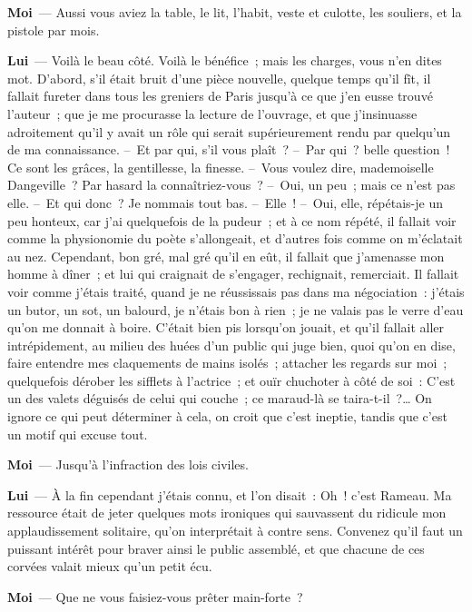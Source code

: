 \documentclass[french,twoside]{book} %
\newcommand{\labelchar}[1]{\textbf{\color{rubric} #1}}
\begin{document}
\labelchar{Moi} — Aussi vous aviez la table, le lit, l’habit, veste et culotte, les souliers, et la pistole par mois.\par
\labelchar{Lui} — Voilà le beau côté. Voilà le bénéfice ; mais les charges, vous n’en dites mot. D’abord, s’il était bruit d’une pièce nouvelle, quelque temps qu’il fît, il fallait fureter dans tous les greniers de Paris jusqu’à ce que j’en eusse trouvé l’auteur ; que je me procurasse la lecture de l’ouvrage, et que j’insinuasse adroitement qu’il y avait un rôle qui serait supérieurement rendu par quelqu’un de ma connaissance. – Et par qui, s’il vous plaît ? – Par qui ? belle question ! Ce sont les grâces, la gentillesse, la finesse. – Vous voulez dire, mademoiselle Dangeville ? Par hasard la connaîtriez-vous ? – Oui, un peu ; mais ce n’est pas elle. – Et qui donc ? Je nommais tout bas. – Elle ! – Oui, elle, répétais-je un peu honteux, car j’ai quelquefois de la pudeur ; et à ce nom répété, il fallait voir comme la physionomie du poète s’allongeait, et d’autres fois comme on m’éclatait au nez. Cependant, bon gré, mal gré qu’il en eût, il fallait que j’amenasse mon homme à dîner ; et lui qui craignait de s’engager, rechignait, remerciait. Il fallait voir comme j’étais traité, quand je ne réussissais pas dans ma négociation : j’étais un butor, un sot, un balourd, je n’étais bon à rien ; je ne valais pas le verre d’eau qu’on me donnait à boire. C’était bien pis lorsqu’on jouait, et qu’il fallait aller intrépidement, au milieu des huées d’un public qui juge bien, quoi qu’on en dise, faire entendre mes claquements de mains isolés ; attacher les regards sur moi ; quelquefois dérober les sifflets à l’actrice ; et ouïr chuchoter à côté de soi : C’est un des valets déguisés de celui qui couche ; ce maraud-là se taira-t-il ?… On ignore ce qui peut déterminer à cela, on croit que c’est ineptie, tandis que c’est un motif qui excuse tout.\par
\labelchar{Moi} — Jusqu’à l’infraction des lois civiles.\par
\labelchar{Lui} — À la fin cependant j’étais connu, et l’on disait : Oh ! c’est Rameau. Ma ressource était de jeter quelques mots ironiques qui sauvassent du ridicule mon applaudissement solitaire, qu’on interprétait à contre sens. Convenez qu’il faut un puissant intérêt pour braver ainsi le public assemblé, et que chacune de ces corvées valait mieux qu’un petit écu.\par
\labelchar{Moi} — Que ne vous faisiez-vous prêter main-forte ?\par
\end{document}
